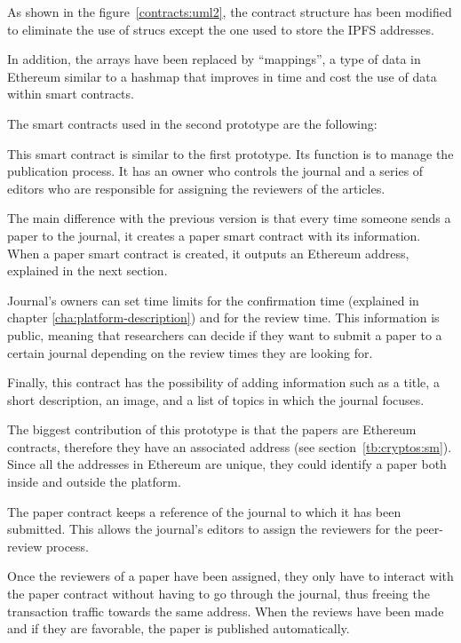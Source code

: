 
As shown in the figure~\ref{contracts:uml2}, the contract structure has been
modified to eliminate the use of strucs except the one used to store the IPFS
addresses.

In addition, the arrays have been replaced by ``mappings'', a type of data in
Ethereum similar to a hashmap that improves in time and cost the use of data
within smart contracts.

The smart contracts used in the second prototype are the following:


This smart contract is similar to the first prototype. Its function is to manage
the publication process. It has an owner who controls the journal and a series
of editors who are responsible for assigning the reviewers of the articles.

The main difference with the previous version is that every time someone sends a
paper to the journal, it creates a paper smart contract with its information.
When a paper smart contract is created, it outputs an Ethereum address,
explained in the next section.

Journal's owners can set time limits for the confirmation time (explained in
chapter \ref{cha:platform-description}) and for the review time. This
information is public, meaning that researchers can decide if they want to
submit a paper to a certain journal depending on the review times they are
looking for.

Finally, this contract has the possibility of adding information such as a
title, a short description, an image, and a list of topics in which the journal
focuses.


The biggest contribution of this prototype is that the papers are Ethereum
contracts, therefore they have an associated address (see
section~\ref{tb:cryptos:sm}). Since all the addresses in Ethereum are unique,
they could identify a paper both inside and outside the platform.

The paper contract keeps a reference of the journal to which it has been
submitted. This allows the journal's editors to assign the reviewers for the
peer-review process.

Once the reviewers of a paper have been assigned, they only have to interact
with the paper contract without having to go through the journal, thus freeing
the transaction traffic towards the same address. When the reviews have been
made and if they are favorable, the paper is published automatically.

